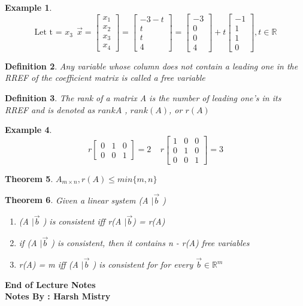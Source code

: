 \documentclass{article}
\newcounter{lecnum}
\newtheorem{theorem}{Theorem}[lecnum]
\newtheorem{ex}[theorem]{Example}
\newtheorem{definition}[theorem]{Definition}
\begin{document}
\begin{ex}
\[ \text{Let t  = } x_3 \ \ \vec{x} = \begin{bmatrix} x_1 \\ x_2 \\ x_3 \\ x_4 \end{bmatrix} = \begin{bmatrix} -3 -t  \\ t \\ t \\ 4  \end{bmatrix} = \begin{bmatrix} -3 \\ 0 \\ 0 \\ 4 \end{bmatrix} + t \begin{bmatrix} -1 \\ 1 \\ 1 \\ 0 \end{bmatrix} , t \in \mathbb{R} \]
\end{ex}

\begin{definition}
Any variable whose column does not contain a leading one in the RREF of the coefficient matrix is called a free variable
\end{definition}

\begin{definition}
The rank of a matrix A is the number of leading one's in its RREF and is denoted as \( rankA \) , \( rank(A) \), or \( r(A) \) 
\end{definition}

\begin{ex}
$$  r \begin{bmatrix} 0 & 1 & 0 \\ 0 & 0 & 1 \end{bmatrix} = 2 \ \ \ \ \ r \begin{bmatrix} 1 & 0 & 0 \\ 0 & 1 & 0 \\ 0 & 0 & 1 \end{bmatrix} = 3   $$
\end{ex}

\begin{theorem}
\( A_{m \times n} , r(A) \leq min\{ m , n \} \) 
\end{theorem}

\begin{theorem}
Given a linear system (A \( \mid \vec{b} \) )  
\begin{enumerate}
\item (A \( \mid \vec{b} \) )  is consistent iff  r(A \( \mid \vec{b} \)) = r(A)   
\item if (A \( \mid \vec{b} \) )  is consistent, then it contains n - r(A) free variables
\item r(A) = m iff (A \( \mid \vec{b} \) ) is consistent for  for every \( \vec{b} \in \mathbb{R} ^m \) 
\end{enumerate}
\end{theorem}

\begin{center}
\textbf{End of Lecture Notes} \\
\textbf{Notes By : Harsh Mistry}
\end{center}
\end{document}

